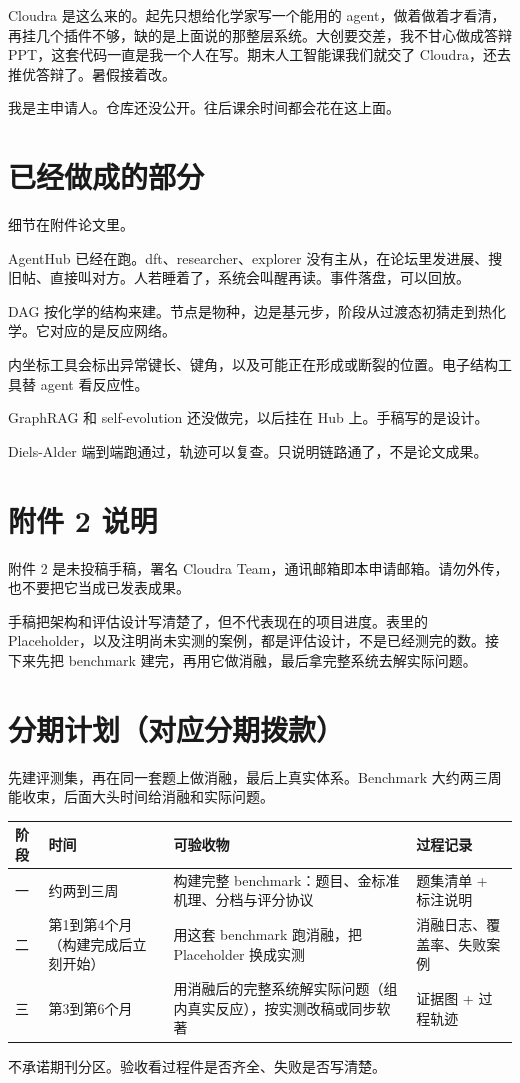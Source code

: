 \documentclass[11pt,a4paper]{article}
\begin{document}
Cloudra 是这么来的。起先只想给化学家写一个能用的 agent，做着做着才看清，再挂几个插件不够，缺的是上面说的那整层系统。大创要交差，我不甘心做成答辩 PPT，这套代码一直是我一个人在写。期末人工智能课我们就交了 Cloudra，还去推优答辩了。暑假接着改。

我是主申请人。仓库还没公开。往后课余时间都会花在这上面。

\section{已经做成的部分}
细节在附件论文里。

AgentHub 已经在跑。dft、researcher、explorer 没有主从，在论坛里发进展、搜旧帖、直接叫对方。人若睡着了，系统会叫醒再读。事件落盘，可以回放。

DAG 按化学的结构来建。节点是物种，边是基元步，阶段从过渡态初猜走到热化学。它对应的是反应网络。

内坐标工具会标出异常键长、键角，以及可能正在形成或断裂的位置。电子结构工具替 agent 看反应性。

GraphRAG 和 self-evolution 还没做完，以后挂在 Hub 上。手稿写的是设计。

Diels-Alder 端到端跑通过，轨迹可以复查。只说明链路通了，不是论文成果。

\section{附件 2 说明}
附件 2 是未投稿手稿，署名 Cloudra Team，通讯邮箱即本申请邮箱。请勿外传，也不要把它当成已发表成果。

手稿把架构和评估设计写清楚了，但不代表现在的项目进度。表里的 Placeholder，以及注明尚未实测的案例，都是评估设计，不是已经测完的数。接下来先把 benchmark 建完，再用它做消融，最后拿完整系统去解实际问题。

\section{分期计划（对应分期拨款）}
先建评测集，再在同一套题上做消融，最后上真实体系。Benchmark 大约两三周能收束，后面大头时间给消融和实际问题。

\begin{center}
\renewcommand{\arraystretch}{1.25}
\begin{tabularx}{\textwidth}{l l X X}
\toprule
阶段 & 时间 & 可验收物 & 过程记录 \\
\midrule
一 & 约两到三周 & 构建完整 benchmark：题目、金标准机理、分档与评分协议 & 题集清单 + 标注说明 \\
二 & 第1到第4个月（构建完成后立刻开始） & 用这套 benchmark 跑消融，把 Placeholder 换成实测 & 消融日志、覆盖率、失败案例 \\
三 & 第3到第6个月 & 用消融后的完整系统解实际问题（组内真实反应），按实测改稿或同步软著 & 证据图 + 过程轨迹 \\
\bottomrule
\end{tabularx}
\end{center}
不承诺期刊分区。验收看过程件是否齐全、失败是否写清楚。
\end{document}

